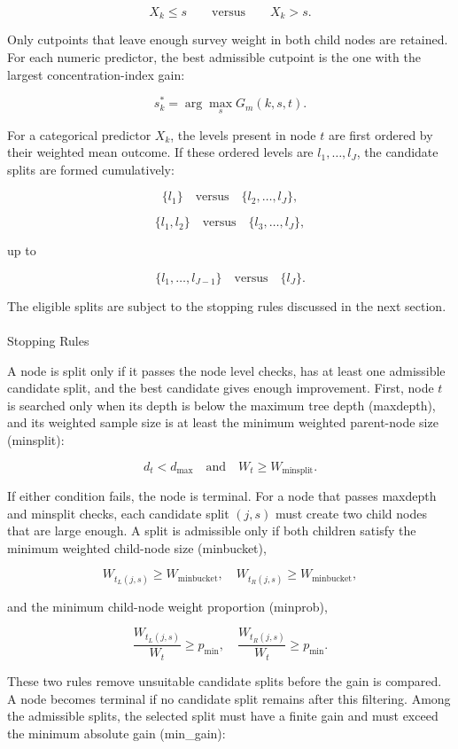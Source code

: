 \documentclass[
  11pt,
  a4paper,
]{article}
\makeatletter
\let\oldparagraph\paragraph
\renewcommand{\paragraph}{
    \@ifstar
      \xxxParagraphStar
      \xxxParagraphNoStar
  }
\newcommand{\xxxParagraphStar}[1]{\oldparagraph*{#1}\mbox{}}
\newcommand{\xxxParagraphNoStar}[1]{\oldparagraph{#1}\mbox{}}
\makeatother
\begin{document}
\[
X_k \leq s
\qquad \text{versus} \qquad
X_k > s.
\]

Only cutpoints that leave enough survey weight in both child nodes are
retained. For each numeric predictor, the best admissible cutpoint is
the one with the largest concentration-index gain:

\[
s_k^* = \arg\max_s G_m(k,s,t).
\]

For a categorical predictor \(X_k\), the levels present in node \(t\)
are first ordered by their weighted mean outcome. If these ordered
levels are \(l_1,\dots,l_J\), the candidate splits are formed
cumulatively:

\[
\{l_1\} \quad \text{versus} \quad \{l_2,\dots,l_J\},
\]

\[
\{l_1,l_2\} \quad \text{versus} \quad \{l_3,\dots,l_J\},
\]

up to

\[
\{l_1,\dots,l_{J-1}\} \quad \text{versus} \quad \{l_J\}.
\]

The eligible splits are subject to the stopping rules discussed in the
next section.

\paragraph{Stopping Rules}\label{sec-stopping-rules}

A node is split only if it passes the node level checks, has at least
one admissible candidate split, and the best candidate gives enough
improvement. First, node \(t\) is searched only when its depth is below
the maximum tree depth (maxdepth), and its weighted sample size is at
least the minimum weighted parent-node size (minsplit):

\[
d_t < d_{\max}
\quad \text{and} \quad
W_t \geq W_{\mathrm{minsplit}}.
\]

If either condition fails, the node is terminal. For a node that passes
maxdepth and minsplit checks, each candidate split \((j,s)\) must create
two child nodes that are large enough. A split is admissible only if
both children satisfy the minimum weighted child-node size (minbucket),

\[
W_{t_L(j,s)} \geq W_{\mathrm{minbucket}},
\quad
W_{t_R(j,s)} \geq W_{\mathrm{minbucket}},
\]

and the minimum child-node weight proportion (minprob),

\[
\frac{W_{t_L(j,s)}}{W_t} \geq p_{\min},
\quad
\frac{W_{t_R(j,s)}}{W_t} \geq p_{\min}.
\]

These two rules remove unsuitable candidate splits before the gain is
compared. A node becomes terminal if no candidate split remains after
this filtering. Among the admissible splits, the selected split must
have a finite gain and must exceed the minimum absolute gain
(min\_gain):
\end{document}
